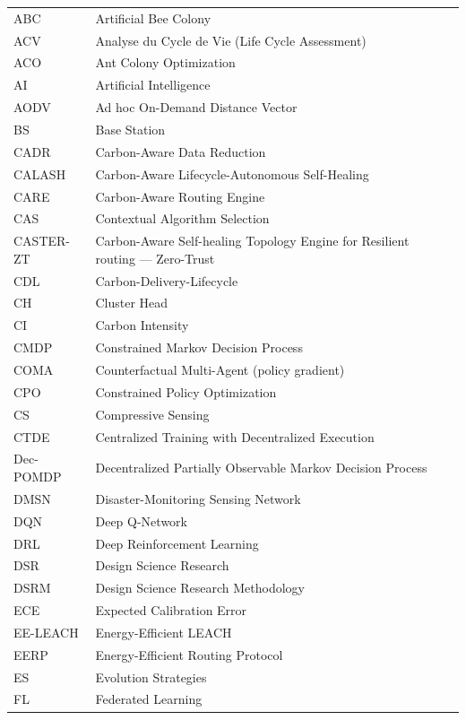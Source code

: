 \begin{longtable}{lp{5in}}
ABC        & Artificial Bee Colony\\
ACV        & Analyse du Cycle de Vie (Life Cycle Assessment)\\
ACO        & Ant Colony Optimization\\
AI         & Artificial Intelligence\\
AODV       & Ad hoc On-Demand Distance Vector\\
BS         & Base Station\\
CADR       & Carbon-Aware Data Reduction\\
CALASH     & Carbon-Aware Lifecycle-Autonomous Self-Healing\\
CARE       & Carbon-Aware Routing Engine\\
CAS        & Contextual Algorithm Selection\\
CASTER-ZT  & Carbon-Aware Self-healing Topology Engine for Resilient routing --- Zero-Trust\\
CDL        & Carbon-Delivery-Lifecycle\\
CH         & Cluster Head\\
CI         & Carbon Intensity\\
CMDP       & Constrained Markov Decision Process\\
COMA       & Counterfactual Multi-Agent (policy gradient)\\
CPO        & Constrained Policy Optimization\\
CS         & Compressive Sensing\\
CTDE       & Centralized Training with Decentralized Execution\\
Dec-POMDP  & Decentralized Partially Observable Markov Decision Process\\
DMSN       & Disaster-Monitoring Sensing Network\\
DQN        & Deep Q-Network\\
DRL        & Deep Reinforcement Learning\\
DSR        & Design Science Research\\
DSRM       & Design Science Research Methodology\\
ECE        & Expected Calibration Error\\
EE-LEACH   & Energy-Efficient LEACH\\
EERP       & Energy-Efficient Routing Protocol\\
ES         & Evolution Strategies\\
FL         & Federated Learning\\

\end{longtable}
